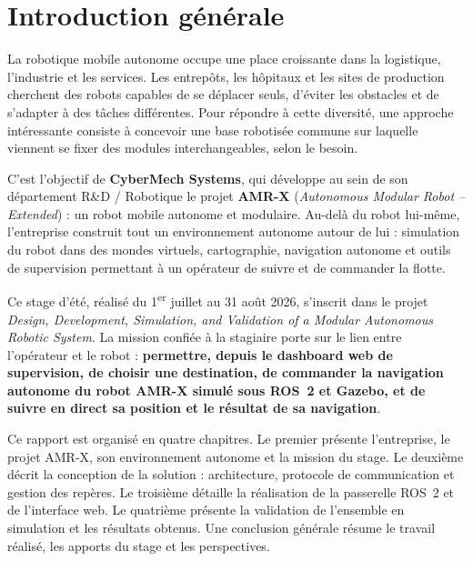 \chapter*{Introduction générale}

La robotique mobile autonome occupe une place croissante dans la logistique, l'industrie
et les services. Les entrepôts, les hôpitaux et les sites de production cherchent des
robots capables de se déplacer seuls, d'éviter les obstacles et de s'adapter à des tâches
différentes. Pour répondre à cette diversité, une approche intéressante consiste à
concevoir une base robotisée commune sur laquelle viennent se fixer des modules
interchangeables, selon le besoin.

C'est l'objectif de \textbf{CyberMech Systems}, qui développe au sein de son département
R\&D / Robotique le projet \textbf{AMR-X} (\emph{Autonomous Modular Robot -- Extended}) :
un robot mobile autonome et modulaire. Au-delà du robot lui-même, l'entreprise construit
tout un environnement autonome autour de lui : simulation du robot dans des mondes
virtuels, cartographie, navigation autonome et outils de supervision permettant à un
opérateur de suivre et de commander la flotte.

Ce stage d'été, réalisé du 1\textsuperscript{er} juillet au 31 août 2026, s'inscrit dans
le projet \emph{Design, Development, Simulation, and Validation of a Modular Autonomous
Robotic System}. La mission confiée à la stagiaire porte sur le lien entre l'opérateur
et le robot : \textbf{permettre, depuis le dashboard web de supervision, de choisir une
destination, de commander la navigation autonome du robot AMR-X simulé sous ROS~2 et
Gazebo, et de suivre en direct sa position et le résultat de sa navigation}.

Ce rapport est organisé en quatre chapitres. Le premier présente l'entreprise, le projet
AMR-X, son environnement autonome et la mission du stage. Le deuxième décrit la
conception de la solution : architecture, protocole de communication et gestion des
repères. Le troisième détaille la réalisation de la passerelle ROS~2 et de l'interface
web. Le quatrième présente la validation de l'ensemble en simulation et les résultats
obtenus. Une conclusion générale résume le travail réalisé, les apports du stage et les
perspectives.
